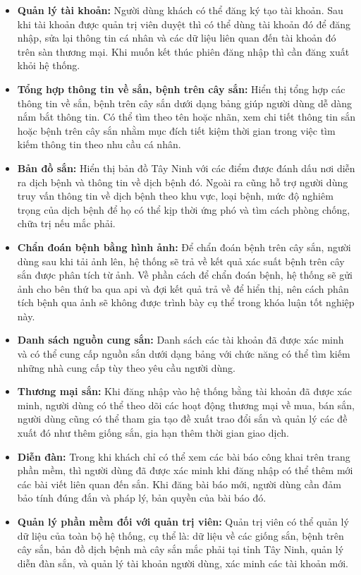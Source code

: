 \documentclass[./../main.tex]{subfiles}
\begin{document}
\begin{itemize} 
    \item \textbf{Quản lý tài khoản:} Người dùng khách có thể đăng ký tạo tài khoản. Sau khi tài khoản được quản trị viên duyệt thì có thể dùng tài khoản đó để đăng nhập, sửa lại thông tin cá nhân và các dữ liệu liên quan đến tài khoản đó trên sàn thương mại. Khi muốn kết thúc phiên đăng nhập thì cần đăng xuất khỏi hệ thống.
    \item \textbf{Tổng hợp thông tin về sắn, bệnh trên cây sắn:} Hiển thị tổng hợp các thông tin về sắn, bệnh trên cây sắn dưới dạng bảng giúp người dùng dễ dàng nắm bắt thông tin. Có thể tìm theo tên hoặc nhãn, xem chi tiết thông tin sắn hoặc bệnh trên cây sắn nhằm mục đích tiết kiệm thời gian trong việc tìm kiếm thông tin theo nhu cầu cá nhân.
    \item \textbf{Bản đồ sắn:} Hiển thị bản đồ Tây Ninh với các điểm được đánh dấu nơi diễn ra dịch bệnh và thông tin về dịch bệnh đó. Ngoài ra cũng hỗ trợ người dùng truy vấn thông tin về dịch bệnh theo khu vực, loại bệnh, mức độ nghiêm trọng của dịch bệnh để họ có thể kịp thời ứng phó và tìm cách phòng chống, chữa trị nếu mắc phải.
    \item \textbf{Chẩn đoán bệnh bằng hình ảnh:} Để chẩn đoán bệnh trên cây sắn, người dùng sau khi tải ảnh lên, hệ thống sẽ trả về kết quả xác suất bệnh trên cây sắn được phân tích từ ảnh. Về phần cách để chẩn đoán bệnh, hệ thống sẽ gửi ảnh cho bên thứ ba qua \acrshort{api} và đợi kết quả trả về để hiển thị, nên cách phân tích bệnh qua ảnh sẽ không được trình bày cụ thể trong khóa luận tốt nghiệp này.
    \item \textbf{Danh sách nguồn cung sắn:} Danh sách các tài khoản đã được xác minh và có thể cung cấp nguồn sắn dưới dạng bảng với chức năng có thể tìm kiếm những nhà cung cấp tùy theo yêu cầu người dùng.
    \item \textbf{Thương mại sắn:} Khi đăng nhập vào hệ thống bằng tài khoản đã được xác minh, người dùng có thể theo dõi các hoạt động thương mại về mua, bán sắn, người dùng cũng có thể tham gia tạo đề xuất trao đổi sắn và quản lý các đề xuất đó như thêm giống sắn, gia hạn thêm thời gian giao dịch.
    \item \textbf{Diễn đàn:} Trong khi khách chỉ có thể xem các bài báo công khai trên trang phần mềm, thì người dùng đã được xác minh khi đăng nhập có thể thêm mới các bài viết liên quan đến sắn. Khi đăng bài báo mới, người dùng cần đảm bảo tính đúng đắn và pháp lý, bản quyền của bài báo đó.
    \item \textbf{Quản lý phần mềm đối với quản trị viên:} Quản trị viên có thể quản lý dữ liệu của toàn bộ hệ thống, cụ thể là: dữ liệu về các giống sắn, bệnh trên cây sắn, bản đồ dịch bệnh mà cây sắn mắc phải tại tỉnh Tây Ninh, quản lý diễn đàn sắn, và quản lý tài khoản người dùng, xác minh các tài khoản mới.
\end{itemize}
\end{document}
